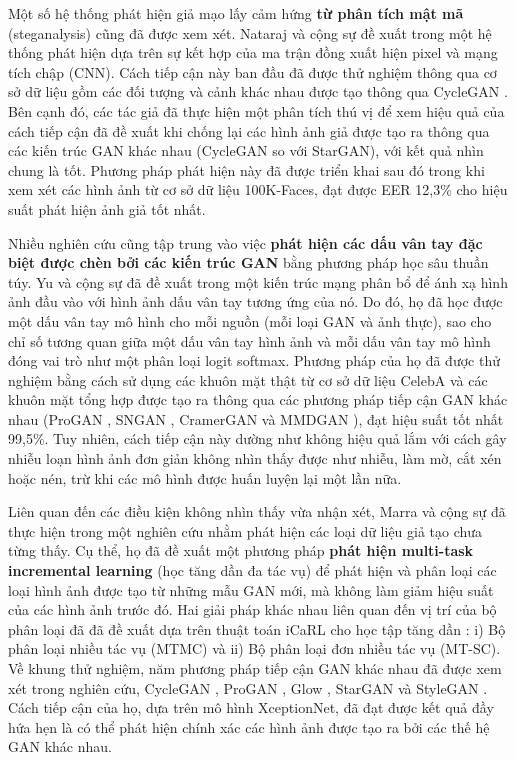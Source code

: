 \documentclass{article}
\begin{document}
Một số hệ thống phát hiện giả mạo lấy cảm hứng \textbf{từ phân tích mật mã} (steganalysis) cũng đã được xem xét. Nataraj và cộng sự đề xuất trong  một hệ thống phát hiện dựa trên sự kết hợp của ma trận đồng xuất hiện pixel và mạng tích chập (CNN). Cách tiếp cận này ban đầu đã được thử nghiệm thông qua cơ sở dữ liệu gồm các đối tượng và cảnh khác nhau được tạo thông qua CycleGAN . Bên cạnh đó, các tác giả đã thực hiện một phân tích thú vị để xem hiệu quả của cách tiếp cận đã đề xuất khi chống lại các hình ảnh giả được tạo ra thông qua các kiến trúc GAN khác nhau (CycleGAN so với StarGAN), với kết quả nhìn chung là tốt. Phương pháp phát hiện này đã được triển khai sau đó trong  khi xem xét các hình ảnh từ cơ sở dữ liệu 100K-Faces, đạt được EER 12,3\% cho hiệu suất phát hiện ảnh giả tốt nhất.

Nhiều nghiên cứu cũng tập trung vào việc \textbf{phát hiện các dấu vân tay đặc biệt được chèn bởi các kiến trúc GAN} bằng phương pháp học sâu thuần túy. Yu và cộng sự đã đề xuất trong  một kiến trúc mạng phân bổ để ánh xạ hình ảnh đầu vào với hình ảnh dấu vân tay tương ứng của nó. Do đó, họ đã học được một dấu vân tay mô hình cho mỗi nguồn (mỗi loại GAN và ảnh thực), sao cho chỉ số tương quan giữa một dấu vân tay hình ảnh và mỗi dấu vân tay mô hình đóng vai trò như một phân loại logit softmax. Phương pháp của họ đã được thử nghiệm bằng cách sử dụng các khuôn mặt thật từ cơ sở dữ liệu CelebA  và các khuôn mặt tổng hợp được tạo ra thông qua các phương pháp tiếp cận GAN khác nhau (ProGAN , SNGAN , CramerGAN  và MMDGAN ), đạt hiệu suất tốt nhất 99,5\%. Tuy nhiên, cách tiếp cận này dường như không hiệu quả lắm với cách gây nhiễu loạn hình ảnh đơn giản không nhìn thấy được như nhiễu, làm mờ, cắt xén hoặc nén, trừ khi các mô hình được huấn luyện lại một lần nữa.

Liên quan đến các điều kiện không nhìn thấy vừa nhận xét, Marra và cộng sự đã thực hiện trong  một nghiên cứu nhằm phát hiện các loại dữ liệu giả tạo chưa từng thấy. Cụ thể, họ đã đề xuất một phương pháp \textbf{phát hiện multi-task incremental learning} (học tăng dần đa tác vụ) để phát hiện và phân loại các loại hình ảnh được tạo từ những mẫu GAN mới, mà không làm giảm hiệu suất của các hình ảnh trước đó. Hai giải pháp khác nhau liên quan đến vị trí của bộ phân loại đã đã đề xuất dựa trên thuật toán iCaRL cho học tập tăng dần : i) Bộ phân loại nhiều tác vụ (MTMC) và ii) Bộ phân loại đơn nhiều tác vụ (MT-SC). Về khung thử nghiệm, năm phương pháp tiếp cận GAN khác nhau đã được xem xét trong nghiên cứu, CycleGAN , ProGAN , Glow , StarGAN  và StyleGAN . Cách tiếp cận của họ, dựa trên mô hình XceptionNet, đã đạt được kết quả đầy hứa hẹn là có thể phát hiện chính xác các hình ảnh được tạo ra bởi các thế hệ GAN khác nhau.
\end{document}
